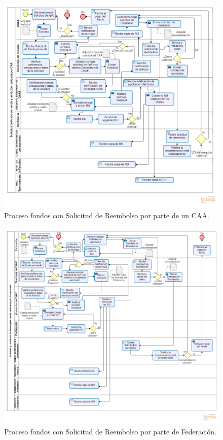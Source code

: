 \begin{figure}[tb!]
    \hspace{-9mm}
    \includegraphics[width=1.1\textwidth]{Imagenes/Solicitud_CCAA_Reembolso.png}
    \caption{\label{fig: Solicitud_CAA_Reembolso}Proceso fondos con Solicitud de Reembolso por parte de un CAA.}
\end{figure}

\begin{figure}[tb!]
    \hspace{-9mm}
    \includegraphics[width=1.1\textwidth]{Imagenes/Solicitud_Federacion_Reembolso.png}
    \caption{\label{fig: Solicitud_Federacion_Reembolso}Proceso fondos con Solicitud de Reembolso por parte de Federación.}
\end{figure}

